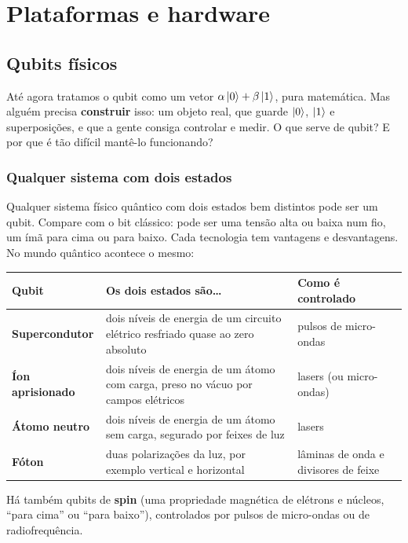\providecommand{\tightlist}{\setlength{\itemsep}{0pt}\setlength{\parskip}{0pt}}
\newpage
\section{Plataformas e hardware}
\subsection{Qubits físicos}
Até agora tratamos o qubit como um vetor \(\alpha\left|{0}\right>+\beta\left|{1}\right>\), pura matemática. Mas alguém precisa \textbf{construir} isso: um objeto real, que guarde \(\left|{0}\right>\), \(\left|{1}\right>\) e superposições, e que a gente consiga controlar e medir. O que serve de qubit? E por que é tão difícil mantê-lo funcionando?

\subsubsection{Qualquer sistema com dois estados}\label{qualquer-sistema-com-dois-estados}

Qualquer sistema físico quântico com dois estados bem distintos pode ser um qubit. Compare com o bit clássico: pode ser uma tensão alta ou baixa num fio, um ímã para cima ou para baixo. Cada tecnologia tem vantagens e desvantagens. No mundo quântico acontece o mesmo:

\begin{center}\begin{tabular}{lll}
\hline

Qubit
 & 
Os dois estados são\ldots{}
 & 
Como é controlado
 \\
\hline

\hline

\textbf{Supercondutor} & dois níveis de energia de um circuito elétrico resfriado quase ao zero absoluto & pulsos de micro-ondas \\
\textbf{Íon aprisionado} & dois níveis de energia de um átomo com carga, preso no vácuo por campos elétricos & lasers (ou micro-ondas) \\
\textbf{Átomo neutro} & dois níveis de energia de um átomo sem carga, segurado por feixes de luz & lasers \\
\textbf{Fóton} & duas polarizações da luz, por exemplo vertical e horizontal & lâminas de onda e divisores de feixe \\
\end{tabular}\end{center}

Há também qubits de \textbf{spin} (uma propriedade magnética de elétrons e núcleos, ``para cima'' ou ``para baixo''), controlados por pulsos de micro-ondas ou de radiofrequência.

